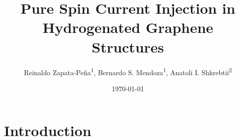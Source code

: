 \documentclass[prb,11pt,tightenlines,twocolumn,aps]{revtex4-1}
\begin{document}
\title{Pure Spin Current Injection in Hydrogenated Graphene Structures}
\author{Reinaldo Zapata-Pe\~na\textsuperscript{1},
        Bernardo S. Mendoza\textsuperscript{1},
        Anatoli I. Shkrebtii\textsuperscript{2}}

\date{\today}

\begin{abstract}
\blindtext
\end{abstract}

\maketitle


\section{Introduction}
\end{document}
